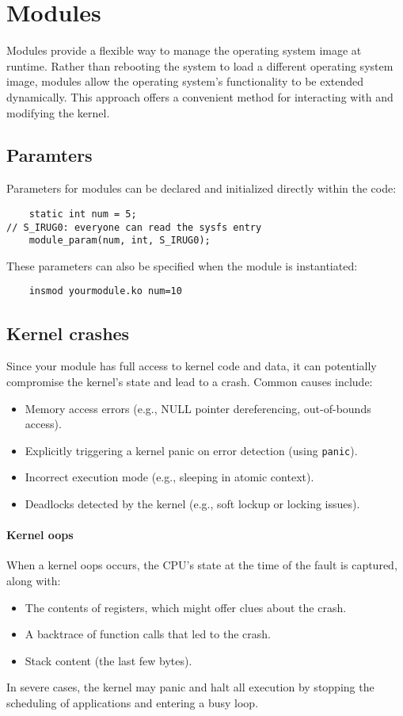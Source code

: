 \section{Modules}

Modules provide a flexible way to manage the operating system image at runtime. 
Rather than rebooting the system to load a different operating system image, modules allow the operating system's functionality to be extended dynamically. 
This approach offers a convenient method for interacting with and modifying the kernel.

\subsection{Paramters}
Parameters for modules can be declared and initialized directly within the code:
\begin{verbatim}
    static int num = 5;
// S_IRUG0: everyone can read the sysfs entry
    module_param(num, int, S_IRUG0);
\end{verbatim}
These parameters can also be specified when the module is instantiated:
\begin{verbatim}
    insmod yourmodule.ko num=10
\end{verbatim}

\subsection{Kernel crashes}
Since your module has full access to kernel code and data, it can potentially compromise the kernel's state and lead to a crash.
Common causes include:
\begin{itemize}
    \item Memory access errors (e.g., NULL pointer dereferencing, out-of-bounds access).
    \item Explicitly triggering a kernel panic on error detection (using \texttt{panic}). 
    \item Incorrect execution mode (e.g., sleeping in atomic context). 
    \item Deadlocks detected by the kernel (e.g., soft lockup or locking issues).
\end{itemize}

\paragraph*{Kernel oops}
When a kernel oops occurs, the CPU's state at the time of the fault is captured, along with: 
\begin{itemize} 
    \item The contents of registers, which might offer clues about the crash. 
    \item A backtrace of function calls that led to the crash. 
    \item Stack content (the last few bytes).
\end{itemize} 
In severe cases, the kernel may panic and halt all execution by stopping the scheduling of applications and entering a busy loop.

